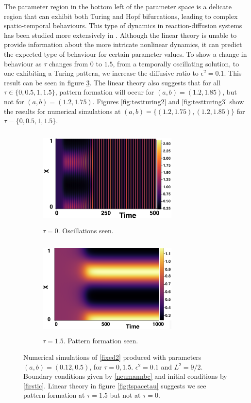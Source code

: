 The parameter region in the bottom left of the parameter space is a delicate region that can exhibit both Turing and Hopf bifurcations, leading to complex spatio-temporal behaviours. This type of dynamics in reaction-diffusion systems has been studied more extensively in \cite{krausefixed,jiang}. Although the linear theory is unable to provide information about the more intricate nonlinear dynamics, it can predict the expected type of behaviour for certain parameter values. To show a change in behaviour as $\tau$ changes from $0$ to $1.5$, from a temporally oscillating solution, to one exhibiting a Turing pattern, we increase the diffusive ratio to $\epsilon^2=0.1$. This result can be seen in figure \ref{fig:testturing}. The linear theory also suggests that for all $\tau\in\{0,0.5,1,1.5\}$, pattern formation will occur for $(a,b)=(1.2,1.85)$, but not for $(a,b)=(1.2,1.75)$. Figures \ref{fig:testturing2} and \ref{fig:testturing3} show the results for numerical simulations at $(a,b)=\{(1.2,1.75),(1.2,1.85)\}$ for $\tau=\{0,0.5,1,1.5\}$.
\begin{figure}[h]
    \centering
    \begin{subfigure}[t]{0.45\textwidth}
        \centering
        \includegraphics[width=7cm,height=5cm]{toscill.png}
        \caption{$\tau=0$. Oscillations seen.}
        \label{}
    \end{subfigure}
    \hfill
    \begin{subfigure}[t]{0.45\textwidth}
        \centering
        \includegraphics[width=7cm,height=5cm]{tpattpred.png}
        \caption{$\tau=1.5$. Pattern formation seen.}
        \label{}
    \end{subfigure}
    \caption{Numerical simulations of \eqref{fixed2} produced with parameters $(a,b)=(0.12,0.5)$, for $\tau=0,1.5$. $\epsilon^2=0.1$ and $L^2=9/2$. Boundary conditions given by \eqref{neumannbc} and initial conditions by \eqref{firstic}. Linear theory in figure \ref{fig:tspacetau} suggests we see pattern formation at $\tau=1.5$ but not at $\tau=0$.}
    \label{fig:testturing}
\end{figure}

